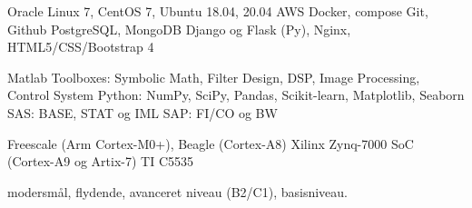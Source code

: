 \documentclass[a4paper]{janus-resume} %
\begin{document}
\begin{minipage}[t]{0.49\textwidth}
Oracle Linux 7, CentOS 7, Ubuntu 18.04, 20.04
\textbullet{} AWS
\textbullet{} Docker, compose
\textbullet{} Git, Github
\textbullet{} PostgreSQL, MongoDB
\textbullet{} Django og Flask (Py), Nginx, HTML5/CSS/Bootstrap 4
\sectionspace %

Matlab Toolboxes: Symbolic Math, Filter Design, DSP, Image Processing, Control System
\textbullet{} Python: NumPy, SciPy, Pandas, Scikit-learn, Matplotlib, Seaborn
\textbullet{} SAS: BASE, STAT og IML
\textbullet{} SAP: FI/CO og BW 
\sectionspace %

Freescale (Arm Cortex-M0+), Beagle (Cortex-A8)
\textbullet{} Xilinx Zynq-7000 SoC (Cortex-A9 og Artix-7)
\textbullet{} TI C5535 \\
\sectionspace %



 modersmål,
 flydende,
 avanceret niveau (B2/C1),
 basisniveau.

\sectionspace %







\end{minipage} %
\end{document}
